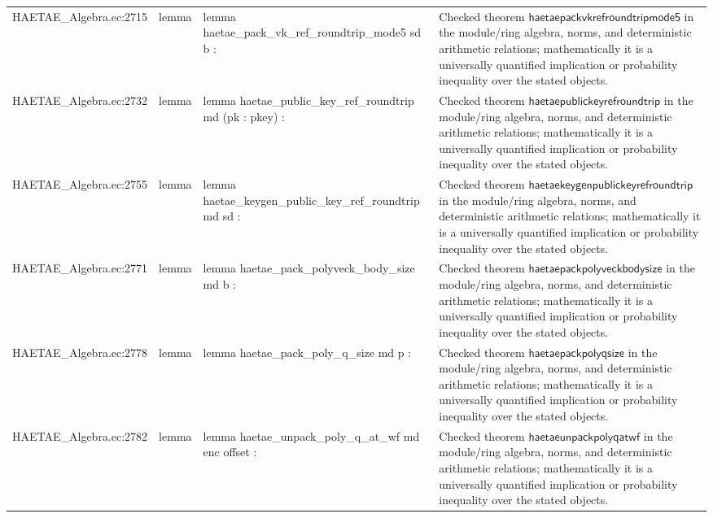 \documentclass[10pt]{article}
\begin{document}
\begin{longtable}{L{0.11\textwidth}L{0.055\textwidth}L{0.385\textwidth}L{0.41\textwidth}}
HAETAE\_\allowbreak{}Algebra.\allowbreak{}ec:\allowbreak{}2715 & lemma & {\ttfamily\scriptsize lemma haetae\_\allowbreak{}pack\_\allowbreak{}vk\_\allowbreak{}ref\_\allowbreak{}roundtrip\_\allowbreak{}mode5 sd b :} & Checked theorem $\mathsf{haetaepackvkrefroundtripmode5}$ in the module/ring algebra, norms, and deterministic arithmetic relations; mathematically it is a universally quantified implication or probability inequality over the stated objects. \\
HAETAE\_\allowbreak{}Algebra.\allowbreak{}ec:\allowbreak{}2732 & lemma & {\ttfamily\scriptsize lemma haetae\_\allowbreak{}public\_\allowbreak{}key\_\allowbreak{}ref\_\allowbreak{}roundtrip md (pk : pkey) :} & Checked theorem $\mathsf{haetaepublickeyrefroundtrip}$ in the module/ring algebra, norms, and deterministic arithmetic relations; mathematically it is a universally quantified implication or probability inequality over the stated objects. \\
HAETAE\_\allowbreak{}Algebra.\allowbreak{}ec:\allowbreak{}2755 & lemma & {\ttfamily\scriptsize lemma haetae\_\allowbreak{}keygen\_\allowbreak{}public\_\allowbreak{}key\_\allowbreak{}ref\_\allowbreak{}roundtrip md sd :} & Checked theorem $\mathsf{haetaekeygenpublickeyrefroundtrip}$ in the module/ring algebra, norms, and deterministic arithmetic relations; mathematically it is a universally quantified implication or probability inequality over the stated objects. \\
HAETAE\_\allowbreak{}Algebra.\allowbreak{}ec:\allowbreak{}2771 & lemma & {\ttfamily\scriptsize lemma haetae\_\allowbreak{}pack\_\allowbreak{}polyveck\_\allowbreak{}body\_\allowbreak{}size md b :} & Checked theorem $\mathsf{haetaepackpolyveckbodysize}$ in the module/ring algebra, norms, and deterministic arithmetic relations; mathematically it is a universally quantified implication or probability inequality over the stated objects. \\
HAETAE\_\allowbreak{}Algebra.\allowbreak{}ec:\allowbreak{}2778 & lemma & {\ttfamily\scriptsize lemma haetae\_\allowbreak{}pack\_\allowbreak{}poly\_\allowbreak{}q\_\allowbreak{}size md p :} & Checked theorem $\mathsf{haetaepackpolyqsize}$ in the module/ring algebra, norms, and deterministic arithmetic relations; mathematically it is a universally quantified implication or probability inequality over the stated objects. \\
HAETAE\_\allowbreak{}Algebra.\allowbreak{}ec:\allowbreak{}2782 & lemma & {\ttfamily\scriptsize lemma haetae\_\allowbreak{}unpack\_\allowbreak{}poly\_\allowbreak{}q\_\allowbreak{}at\_\allowbreak{}wf md enc offset :} & Checked theorem $\mathsf{haetaeunpackpolyqatwf}$ in the module/ring algebra, norms, and deterministic arithmetic relations; mathematically it is a universally quantified implication or probability inequality over the stated objects. \\

\end{longtable}
\end{document}
